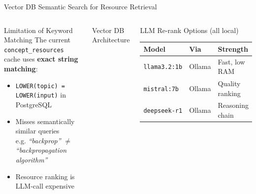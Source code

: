 \documentclass[aspectratio=169,9pt]{beamer}
\begin{document}
\begin{frame}{Vector DB Semantic Search for Resource Retrieval}
\begin{columns}[T]
  \begin{block}{Limitation of Keyword Matching}
    The current \texttt{concept\_resources} cache uses \textbf{exact string matching}:
    \begin{itemize}
      \item \texttt{LOWER(topic) = LOWER(input)} in PostgreSQL
      \item Misses semantically similar queries\\
        e.g. \textit{``backprop''} $\neq$ \textit{``backpropagation algorithm''}
      \item Resource ranking is LLM-call expensive
    \end{itemize}
  \end{block}

  \begin{block}{Vector DB Architecture}
  \end{block}

  \begin{block}{LLM Re-rank Options (all local)}
    \small
    \begin{tabular}{@{}lll@{}}
      \textbf{Model} & \textbf{Via} & \textbf{Strength} \\
      \midrule
      \texttt{llama3.2:1b} & Ollama & Fast, low RAM \\
      \texttt{mistral:7b}  & Ollama & Quality ranking \\
      \texttt{deepseek-r1} & Ollama & Reasoning chain \\
    \end{tabular}
  \end{block}


\end{columns}
\end{frame}
\end{document}
